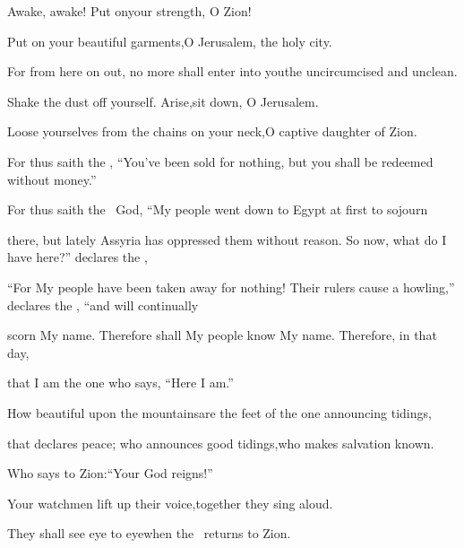 
\begin{inparaenum}
  \pa {} Awake, awake!%
  Put on\pa your strength, O Zion!
  
  \pb Put on your beautiful garments,\pa O Jerusalem, the holy city.%
  
  \pb For from here on out, no more shall enter into you\pa the uncircumcised and unclean.%
  
  \pa {} Shake the dust off yourself. Arise,\pa sit down, O Jerusalem.%
  
  \pb Loose yourselves from the chains on your neck,\pa O captive daughter of Zion.\bigskip%
  
  \pc {} For thus saith the \lord, ``You've been sold for nothing, but you shall be redeemed without money.''%
  
  \pc {} For thus saith the \lord\ God, ``My people went down to Egypt at first to sojourn%
  
  \pc there, but lately Assyria has oppressed them without reason. \pa {} So now, what do I have here?'' declares the \lord,%
  
  \pc ``For My people have been taken away for nothing! Their rulers cause a howling,'' declares the \lord, ``and will continually%
  
  \pc scorn My name.\pa {} Therefore shall My people know My name. Therefore, in that day,%
  
  \pc {} that I am the one who says, ``Here I am.''%
  
  \pa {} How beautiful upon the mountains\pa are the feet of the one announcing tidings,%
  
  \pb that declares peace; who announces good tidings,\pa who makes salvation known.%
  
  \pb Who says to Zion:\pa ``Your God reigns!''%
  
  \pa {} Your watchmen lift up their voice,\pa together they sing aloud.%
  
  \pb They shall see eye to eye\pa when the \lord\ returns to Zion.%
  

\end{inparaenum}
